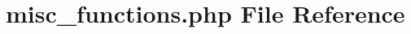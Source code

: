 \hypertarget{misc__functions_8php}{
\section{misc\_\-functions.php File Reference}
\label{misc__functions_8php}
}
